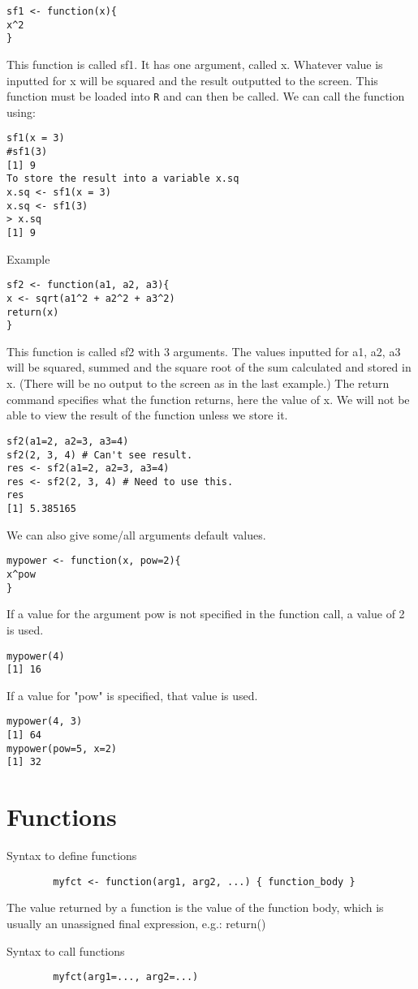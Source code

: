 \begin{verbatim}sf1 <- function(x){
x^2
}
\end{verbatim}

This function is called sf1. It has one argument, called x.
Whatever value is inputted for x will be squared and the result outputted to the screen. This function must be loaded into \texttt{R} and can then be called. We can call the function using:
\begin{verbatim}
sf1(x = 3)
#sf1(3)
[1] 9
To store the result into a variable x.sq
x.sq <- sf1(x = 3)
x.sq <- sf1(3)
> x.sq
[1] 9
\end{verbatim}
Example
\begin{verbatim}
sf2 <- function(a1, a2, a3){
x <- sqrt(a1^2 + a2^2 + a3^2)
return(x)
}
\end{verbatim}

This function is called sf2 with 3 arguments. The values inputted for a1, a2, a3 will be squared, summed and the square root of the sum calculated and stored in x. (There will be no output to the screen as in the last example.)
The return command specifies what the function returns, here the value of x. We will not be able to view the result of the function unless we store it.
\begin{verbatim}sf2(a1=2, a2=3, a3=4)
sf2(2, 3, 4) # Can't see result.
res <- sf2(a1=2, a2=3, a3=4)
res <- sf2(2, 3, 4) # Need to use this.
res
[1] 5.385165
\end{verbatim}
We can also give some/all arguments default values.
\begin{verbatim}mypower <- function(x, pow=2){
x^pow
}
\end{verbatim}
If a value for the argument pow is not specified in the function call,
a value of 2 is used.
\begin{verbatim}mypower(4)
[1] 16
\end{verbatim}
If a value for "pow" is specified, that value is used.
\begin{verbatim}
mypower(4, 3)
[1] 64
mypower(pow=5, x=2)
[1] 32
\end{verbatim}


\section{Functions}
Syntax to define functions

\begin{myindentpar}{1cm}
\begin{verbatim}
        myfct <- function(arg1, arg2, ...) { function_body }
\end{verbatim}
\end{myindentpar}
The value returned by a function is the value of the function body, which is usually an unassigned final expression, e.g.: return()

Syntax to call functions
\begin{myindentpar}{1cm}
\begin{verbatim}
        myfct(arg1=..., arg2=...)
\end{verbatim}
\end{myindentpar}

